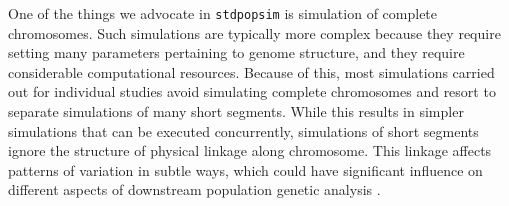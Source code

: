 \documentclass[hidelinks]{article}
\begin{document}
One of the things we advocate in \texttt{stdpopsim} is simulation of complete
chromosomes. Such simulations are typically more complex because they require
setting many parameters pertaining to genome structure, and they require
considerable computational resources. Because of this, most simulations carried
out for individual studies avoid simulating complete chromosomes and resort to
separate simulations of many short segments. While this results in simpler
simulations that can be executed concurrently, %
simulations of short segments ignore the structure of physical linkage along
chromosome. This linkage affects patterns of variation in subtle ways, which could
have significant influence on different aspects of downstream population genetic
analysis \citep{Nelson2020}. 


%
\end{document}
